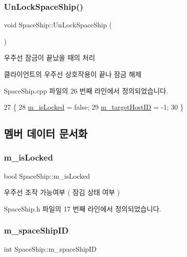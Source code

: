 \subsubsection{\texorpdfstring{Un\+Lock\+Space\+Ship()}{UnLockSpaceShip()}}
{\footnotesize\ttfamily void Space\+Ship\+::\+Un\+Lock\+Space\+Ship (\begin{DoxyParamCaption}{ }\end{DoxyParamCaption})}



우주선 잠금이 끝났을 때의 처리 

클라이언트의 우주선 상호작용이 끝나 잠금 해제 

Space\+Ship.\+cpp 파일의 26 번째 라인에서 정의되었습니다.


\begin{DoxyCode}
27 \{
28     \hyperlink{class_space_ship_afc1bca7c7439f00cd66b4f415e76f0f6}{m\_isLocked} = \textcolor{keyword}{false}; 
29     \hyperlink{class_space_ship_a7b8bd199405824c96906094a2e1312c6}{m\_targetHostID} = -1; 
30 \}
\end{DoxyCode}


\subsection{멤버 데이터 문서화}
\mbox{\label{class_space_ship_afc1bca7c7439f00cd66b4f415e76f0f6}} 
\subsubsection{\texorpdfstring{m\+\_\+is\+Locked}{m\_isLocked}}
{\footnotesize\ttfamily bool Space\+Ship\+::m\+\_\+is\+Locked\hspace{0.3cm}{\ttfamily [private]}}



우주선 조작 가능여부 ( 잠김 상태 여부 ) 



Space\+Ship.\+h 파일의 17 번째 라인에서 정의되었습니다.

\mbox{\label{class_space_ship_a03b4dcfdfa8771db1e462eb6b9b15055}} 
\subsubsection{\texorpdfstring{m\+\_\+space\+Ship\+ID}{m\_spaceShipID}}
{\footnotesize\ttfamily int Space\+Ship\+::m\+\_\+space\+Ship\+ID\hspace{0.3cm}{\ttfamily [private]}}



